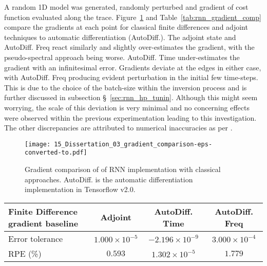A random 1D model was generated, randomly perturbed and gradient of cost function evaluated along the trace. Figure~\ref{fig:rnn_gradient_comp} and Table~\ref{tab:rnn_gradient_comp} compare the gradients at each point for classical finite differences and adjoint techniques to automatic differentiation (AutoDiff.). The adjoint state and AutoDiff. Freq react similarly and slightly over-estimates the gradient, with the pseudo-spectral approach being worse. AutoDiff. Time under-estimates the gradient with an infinitesimal error. Gradients deviate at the edges in either case, with AutoDiff. Freq producing evident perturbation in the initial few time-steps. This is due to the choice of the batch-size within the inversion process and is further discussed in subsection §~\ref{sec:rnn_hp_tunin}. Although this might seem worrying, the scale of this deviation is very minimal and no concerning effects were observed within the previous experimentation leading to this investigation. The other discrepancies are attributed to numerical inaccuracies as per \cite{Richardson2018}.
\begin{figure}[ht!]
    \centering
    \texttt{[image: 15\_Dissertation\_03\_gradient\_comparison-eps-converted-to.pdf]}
    \caption[Gradient comparison of RNN implementation with classical approaches.]{Gradient comparison of of RNN implementation with classical approaches. AutoDiff. is the automatic differentiation implementation in Tensorflow v2.0.}
    \label{fig:rnn_gradient_comp}
\end{figure}
\begin{table*}[!ht]
    \footnotesize
    \centering
    \begin{tabular}{@{}lccc@{}}\toprule
        \textbf{Finite Difference gradient baseline} & Adjoint & AutoDiff. Time & AutoDiff. Freq \\ \hline 
        Error tolerance                     & $1.000\times10^{-5}$ & $-2.196\times10^{-9}$      & $3.000\times10^{-4}$       \\
        RPE (\%)                            & $0.593$   & $1.302\times10^{-5}$      & $1.779$        \\ \hline 
    \end{tabular}
    \caption{Empirical comparison of gradient calculations.}\label{tab:rnn_gradient_comp}
\end{table*}

